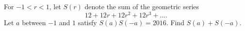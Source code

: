 For $-1<r<1$, let $S\left(r\right)$ denote the sum of the geometric series \[12+12r+12r^2+12r^3+\ldots.\] Let $a$ between $-1$ and $1$ satisfy $S\left(a\right)S\left(-a\right)=2016$. Find $S\left(a\right)+S\left(-a\right)$.